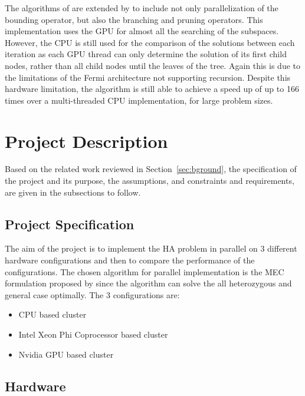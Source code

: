 \documentclass[10pt,a4paer,twocolumn]{article}
\begin{document}
The algorithms of \cite{melab:2012, chakroun:2012} are extended by \cite{chakroun:2013} to 
include not only parallelization of the bounding operator, but also the branching and pruning operators. This
implementation uses the GPU for almost all the searching of the subspaces. However, the CPU is still used for the
comparison of the solutions between each iteration as each GPU thread can only determine the solution of its 
first child nodes, rather than all child nodes until the leaves of the tree. Again this is due to the limitations 
of the Fermi architecture not supporting recursion. Despite this hardware limitation, the algorithm is still able
to achieve a speed up of up to 166 times over a multi-threaded CPU implementation, for large problem sizes.


\section{Project Description} \label{sec:projdes}

Based on the related work reviewed in Section~\ref{sec:bground}, the specification of the project and its 
purpose, the assumptions, and constraints and requirements, are given in the subsections to follow.

\subsection{ Project Specification } \label{sec:projspec}

The aim of the project is to implement the HA problem in parallel on 3 different hardware configurations and 
then to compare the performance of the configurations. The chosen algorithm for parallel implementation is 
the MEC formulation proposed by \cite{chen:2013} since the algorithm can solve the all heterozygous and 
general case optimally. The 3 configurations are:
\begin{itemize}[noitemsep]
    \item{CPU based cluster}
    \item{Intel Xeon Phi Coprocessor based cluster}
    \item{Nvidia GPU based cluster}
\end{itemize}

\subsection{Hardware} \label{ssec:hware}
\end{document}
